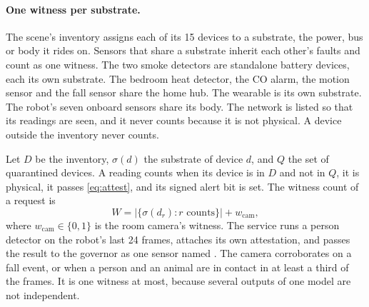 \paragraph{One witness per substrate.} The scene's inventory assigns each of its 15 devices to a
substrate, the power, bus or body it rides on. Sensors that share a substrate inherit each other's
faults and count as one witness. The two smoke detectors are standalone battery devices, each its own
substrate. The bedroom heat detector, the CO alarm, the motion sensor and the fall sensor share the
home hub. The wearable is its own substrate. The robot's seven onboard sensors share its body. The
network is listed so that its readings are seen, and it never counts because it is not physical. A
device outside the inventory never counts.

Let $D$ be the inventory, $\sigma(d)$ the substrate of device $d$, and $Q$ the set of quarantined
devices. A reading counts when its device is in $D$ and not in $Q$, it is physical, it passes
\eqref{eq:attest}, and its signed alert bit is set. The witness count of a request is
\begin{equation}
W = \bigl|\{\sigma(d_r) : r \text{ counts}\}\bigr| + w_{\mathrm{cam}},
\label{eq:witness}
\end{equation}
where $w_{\mathrm{cam}}\in\{0,1\}$ is the room camera's witness. The service runs a person detector on
the robot's last 24 frames, attaches its own attestation, and passes the result to the governor as
one sensor named . The camera corroborates on a fall event, or when a person and an
animal are in contact in at least a third of the frames. It is one witness at most, because several
outputs of one model are not independent.

